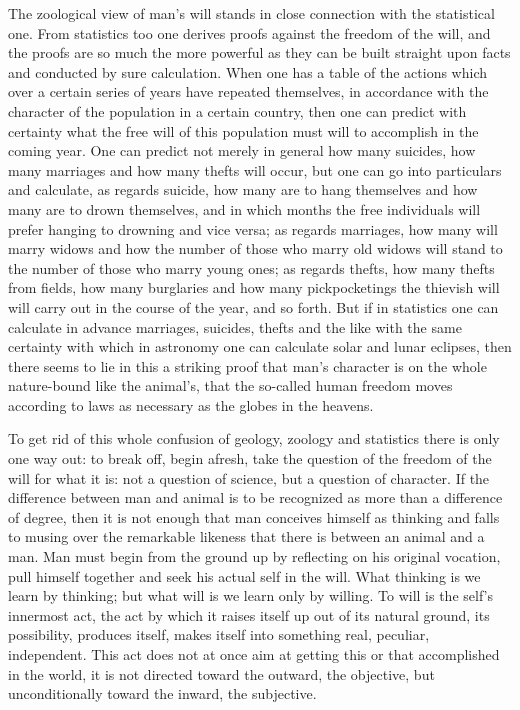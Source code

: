 \documentclass[12pt,a4paper,openany]{book}
\newcommand{\opage}[1]{\marginnote{\footnotesize\textit{[#1]}}}
\begin{document}
The zoological view of man's will stands
in close connection with the statistical one. From statistics too
one derives proofs against the freedom of the will, and the proofs
are so much the more powerful as they can be
built straight upon facts and conducted by sure calculation.
When one has a table of the actions which
over a certain series of years have repeated themselves, in accordance
with the character of the population in a certain country, then one
can predict with certainty what the free will
of this population must will to accomplish in the coming
year. One can predict not merely in general how many
suicides, how many marriages and how many
thefts will occur, but one can go into particulars
and calculate, as regards suicide, how many are
to hang themselves and how many are to drown themselves,
and in which months the free individuals will prefer
hanging to drowning and vice versa; as regards marriages,
how many will marry widows
and how the number of those who marry old
widows will stand to the number of those who marry
young ones; as regards thefts, how many thefts from fields,
how many burglaries and how many pickpocketings
the thievish will will carry out in the course of the year,
and so forth. But if in statistics one can calculate in advance
marriages, suicides, thefts and the like with the same certainty
with which in astronomy one can calculate solar and
\setcounter{footnote}{0}%
\opage{497}lunar eclipses, then there seems to lie in this a striking
proof that man's character is on the whole nature-bound
like the animal's, that the so-called human freedom
moves according to laws as necessary as the globes
in the heavens.

To get rid of this whole confusion of geology,
zoology and statistics there is only one way out:
to break off, begin afresh, take the question of the freedom
of the will for what it is: not a question of science,
but a question of character. If the difference between
man and animal is to be recognized as more than a difference of degree,
then it is not enough that man conceives himself as
thinking and falls to musing over the remarkable likeness
that there is between an animal and a man. Man
must begin from the ground up by reflecting on his
original vocation, pull himself together and seek his actual
self in the will. What thinking is we learn by
thinking; but what will is we learn only by willing.
To will is the self's innermost act, the act by which
it raises itself up out of its natural ground, its possibility,
produces itself, makes itself into something real, peculiar,
independent. This act does not
at once aim at getting this or that accomplished in the world,
it is not directed toward the outward, the objective, but
unconditionally toward the inward, the subjective.
\end{document}
